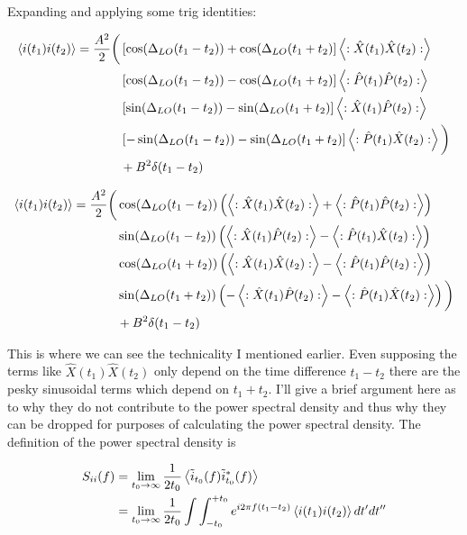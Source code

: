 \documentclass[12pt]{article}
\begin{document}
Expanding and applying some trig identities:

\begin{align}
\Braket{i(t_1)i(t_2)} = \frac{A^2}{2} \bigg(&\left[\cos(\Delta_{LO}(t_1-t_2))+\cos(\Delta_{LO}(t_1+t_2)\right]\Braket{:\hat{X}(t_1)\hat{X}(t_2):}\\
&\left[\cos(\Delta_{LO}(t_1-t_2))-\cos(\Delta_{LO}(t_1+t_2)\right]\Braket{:\hat{P}(t_1)\hat{P}(t_2):}\\
&\left[\sin(\Delta_{LO}(t_1-t_2))-\sin(\Delta_{LO}(t_1+t_2)\right]\Braket{:\hat{X}(t_1)\hat{P}(t_2):}\\
&\left[-\sin(\Delta_{LO}(t_1-t_2))-\sin(\Delta_{LO}(t_1+t_2)\right]\Braket{:\hat{P}(t_1)\hat{X}(t_2):}\bigg)\\
&+B^2 \delta(t_1-t_2)
\end{align}

\begin{align}
\Braket{i(t_1)i(t_2)} = \frac{A^2}{2} \bigg(
&\cos(\Delta_{LO}(t_1-t_2))\left(\Braket{:\hat{X}(t_1)\hat{X}(t_2):} + \Braket{:\hat{P}(t_1)\hat{P}(t_2):}\right)\\
&\sin(\Delta_{LO}(t_1-t_2))\left(\Braket{:\hat{X}(t_1)\hat{P}(t_2):} - \Braket{:\hat{P}(t_1)\hat{X}(t_2):}\right)\\
&\cos(\Delta_{LO}(t_1+t_2))\left(\Braket{:\hat{X}(t_1)\hat{X}(t_2):} - \Braket{:\hat{P}(t_1)\hat{P}(t_2):}\right)\\
&\sin(\Delta_{LO}(t_1+t_2))\left(-\Braket{:\hat{X}(t_1)\hat{P}(t_2):} - \Braket{:\hat{P}(t_1)\hat{X}(t_2):}\right)\bigg)\\
&+B^2\delta(t_1-t_2)
\end{align}

This is where we can see the technicality I mentioned earlier. Even supposing the terms like $\hat{X}(t_1)\hat{X}(t_2)$ only depend on the time difference $t_1-t_2$ there are the pesky sinusoidal terms which depend on $t_1+t_2$. I'll give a brief argument here as to why they do not contribute to the power spectral density and thus why they can be dropped for purposes of calculating the power spectral density. The definition of the power spectral density is

\begin{align}
S_{ii}(f) &= \lim_{t_0\rightarrow \infty} \frac{1}{2 t_0}\Braket{\tilde{i}_{t_0}(f)\tilde{i}_{t_0}^*(f)}\\
&=\lim_{t_0\rightarrow \infty} \frac{1}{2 t_0} \int \int_{-t_0}^{+t_0} e^{i2\pi f(t_1-t_2)} \Braket{i(t_1)i(t_2)} dt' dt''
\end{align}
\end{document}

